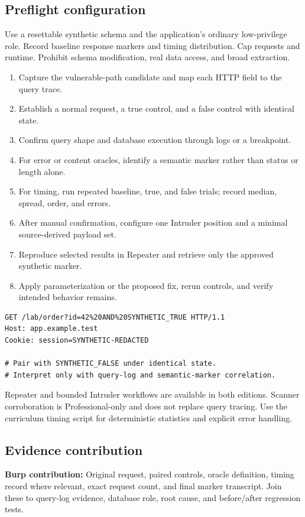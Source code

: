 \documentclass[11pt]{article}
\newcommand{\weekfield}[2]{%
  \Needspace{5\baselineskip}
  \subsection*{#1}
  #2
}
\newcommand{\burpevidence}[1]{\textbf{Burp contribution:} #1}
\begin{document}
\weekfield{Preflight configuration}{Use a resettable synthetic schema and the
application's ordinary low-privilege role. Record baseline response markers and
timing distribution. Cap requests and runtime. Prohibit schema modification,
real data access, and broad extraction.}

\begin{procedurebox}
\begin{enumerate}
  \item Capture the vulnerable-path candidate and map each HTTP field to the query trace.
  \item Establish a normal request, a true control, and a false control with identical state.
  \item Confirm query shape and database execution through logs or a breakpoint.
  \item For error or content oracles, identify a semantic marker rather than status or length alone.
  \item For timing, run repeated baseline, true, and false trials; record median, spread, order, and errors.
  \item After manual confirmation, configure one Intruder position and a minimal source-derived payload set.
  \item Reproduce selected results in Repeater and retrieve only the approved synthetic marker.
  \item Apply parameterization or the proposed fix, rerun controls, and verify intended behavior remains.
\end{enumerate}
\end{procedurebox}

\begin{lstlisting}[caption={Paired blind-inference controls}]
GET /lab/order?id=42%20AND%20SYNTHETIC_TRUE HTTP/1.1
Host: app.example.test
Cookie: session=SYNTHETIC-REDACTED

# Pair with SYNTHETIC_FALSE under identical state.
# Interpret only with query-log and semantic-marker correlation.
\end{lstlisting}

\begin{editionbox}
Repeater and bounded Intruder workflows are available in both editions. Scanner
corroboration is Professional-only and does not replace query tracing. Use the
curriculum timing script for deterministic statistics and explicit error handling.
\end{editionbox}

\weekfield{Evidence contribution}{\burpevidence{Original request, paired controls,
oracle definition, timing record where relevant, exact request count, and final
marker transcript.} Join these to query-log evidence, database role, root cause,
and before/after regression tests.}
\end{document}

